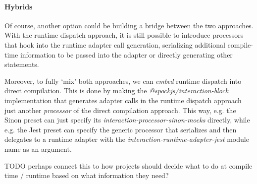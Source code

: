 \paragraph{Hybrids}
Of course, another option could be
building a bridge between the two approaches.
With the runtime dispatch approach,
it is still possible to introduce processors that hook into
the runtime adapter call generation,
serializing additional compile-time information
to be passed into the adapter
or directly generating other statements.

Moreover, to fully `mix' both approaches,
we can \textit{embed} runtime dispatch into direct compilation.
This is done by making the \textit{@spockjs/interaction-block} implementation
that generates adapter calls in the runtime dispatch approach
just another \textit{processor} of the direct compilation approach.
This way, e.g. the Sinon preset can just specify
its \textit{interaction-processor-sinon-mocks} directly,
while e.g. the Jest preset can specify the generic processor
that serializes and then delegates to a runtime adapter
with the \textit{interaction-runtime-adapter-jest} module name as an argument.

TODO perhaps connect this to how projects should decide what to do at compile time / runtime based on what information they need?
